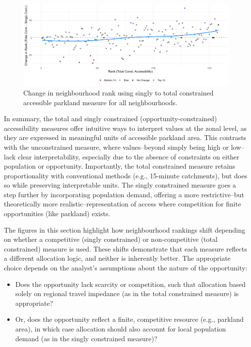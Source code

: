 \documentclass[
11pt, %
oneside, %
english, %
singlespacing, %
]{macthesis} %
\def\tightlist{}
\begin{document}
\begin{figure}

{\centering \includegraphics[width=6in]{./data/figures/chp4-all_rank_change_parkland_access_neigh_plot} 

}

\caption{\label{fig:chp4-all_rank_change_parkland_access_neigh_plot}Change in neighbourhood rank using singly to total constrained accessible parkland measure for all neighbourhoods.}\label{fig:unnamed-chunk-67}
\end{figure}

In summary, the total and singly constrained (opportunity-constrained) accessibility measures offer intuitive ways to interpret values at the zonal level, as they are expressed in meaningful units of accessible parkland area. This contrasts with the unconstrained measure, where values--beyond simply being high or low--lack clear interpretability, especially due to the absence of constraints on either population or opportunity. Importantly, the total constrained measure retains proportionality with conventional methods (e.g., 15-minute catchments), but does so while preserving interpretable units. The singly constrained measure goes a step further by incorporating population demand, offering a more restrictive--but theoretically more realistic--representation of access where competition for finite opportunities (like parkland) exists.

The figures in this section highlight how neighbourhood rankings shift depending on whether a competitive (singly constrained) or non-competitive (total constrained) measure is used. These shifts demonstrate that each measure reflects a different allocation logic, and neither is inherently better. The appropriate choice depends on the analyst's assumptions about the nature of the opportunity:

\begin{itemize}
\tightlist
\item
  Does the opportunity lack scarcity or competition, such that allocation based solely on regional travel impedance (as in the total constrained measure) is appropriate?
\item
  Or, does the opportunity reflect a finite, competitive resource (e.g., parkland area), in which case allocation should also account for local population demand (as in the singly constrained measure)?
\end{itemize}
\end{document}
